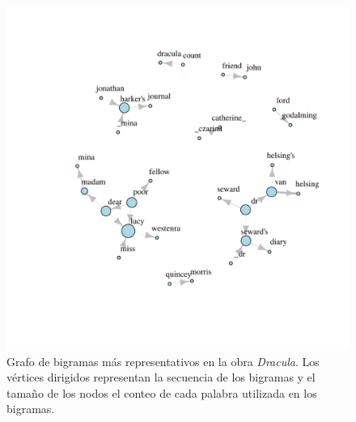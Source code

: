 \documentclass[paper=leter, fontsize=11pt]{scrartcl}
\numberwithin{equation}{section}		%
\numberwithin{figure}{section}			%
\numberwithin{table}{section}				%
\begin{document}
\begin{figure}
    \centering
    \includegraphics[width=1\textwidth]{bigramas.pdf}
    \caption{Grafo de bigramas más representativos en la obra \textit{Dracula}. Los vértices dirigidos representan la secuencia de los bigramas y el tamaño de los nodos el conteo de cada palabra utilizada en los bigramas.}
    \label{bigramas}
\end{figure}



\end{document}
